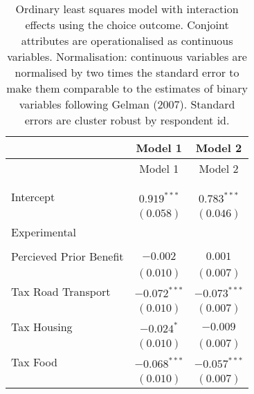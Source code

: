 
\begin{center}
\begin{tiny}
\begin{longtable}{l@{} c@{} c@{}}
\hline
 & Model 1 & Model 2 \\
\hline
\endfirsthead
\hline
 & Model 1 & Model 2 \\
\hline
\endhead
\hline
\endfoot
\hline
\multicolumn{3}{l}{\tiny{$^{***}p<0.001$; $^{**}p<0.01$; $^{*}p<0.05$; $^{\cdot}p<0.1$}}\\
\caption{Ordinary least squares model with interaction effects using the choice outcome. Conjoint attributes are operationalised as continuous variables. Normalisation: continuous variables are normalised by two times
               the standard error to make them comparable to the estimates of binary variables following Gelman (2007). Standard errors are cluster robust by respondent id.}
\label{table:linear_interactions_exp_continuous_choice}
\endlastfoot \\
Intercept                                              & $0.919^{***}$   & $0.783^{***}$  \\
                                                       & $(0.058)$       & $(0.046)$      \\
Experimental                                           &                 &                \\
                                                       &                 &                \\
\quad Percieved Prior Benefit                          & $-0.002$        & $0.001$        \\
                                                       & $(0.010)$       & $(0.007)$      \\
\quad Tax Road Transport                               & $-0.072^{***}$  & $-0.073^{***}$ \\
                                                       & $(0.010)$       & $(0.007)$      \\
\quad Tax Housing                                      & $-0.024^{*}$    & $-0.009$       \\
                                                       & $(0.010)$       & $(0.007)$      \\
\quad Tax Food                                         & $-0.068^{***}$  & $-0.057^{***}$ \\
                                                       & $(0.010)$       & $(0.007)$      \\

\end{longtable}
\end{tiny}
\end{center}
